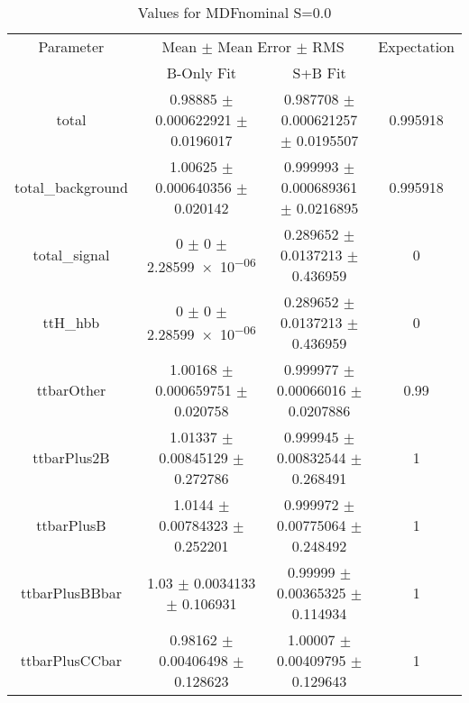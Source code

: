 \begin{table}
\centering
\caption{Values for MDFnominal S=0.0}
\begin{tabular}{cccc}
\toprule
Parameter & \multicolumn{2}{c}{Mean $\pm$ Mean Error $\pm$ RMS} & Expectation\\
 & B-Only Fit & S+B Fit & \\
\midrule
total & \num{0.98885} $\pm$ \num{0.000622921} $\pm$ \num{0.0196017} & \num{0.987708} $\pm$ \num{0.000621257} $\pm$ \num{0.0195507} & \num{0.995918}\\
total\_background & \num{1.00625} $\pm$ \num{0.000640356} $\pm$ \num{0.020142} & \num{0.999993} $\pm$ \num{0.000689361} $\pm$ \num{0.0216895} & \num{0.995918}\\
total\_signal & \num{0} $\pm$ \num{0} $\pm$ \num{2.28599e-06} & \num{0.289652} $\pm$ \num{0.0137213} $\pm$ \num{0.436959} & \num{0}\\
ttH\_hbb & \num{0} $\pm$ \num{0} $\pm$ \num{2.28599e-06} & \num{0.289652} $\pm$ \num{0.0137213} $\pm$ \num{0.436959} & \num{0}\\
ttbarOther & \num{1.00168} $\pm$ \num{0.000659751} $\pm$ \num{0.020758} & \num{0.999977} $\pm$ \num{0.00066016} $\pm$ \num{0.0207886} & \num{0.99}\\
ttbarPlus2B & \num{1.01337} $\pm$ \num{0.00845129} $\pm$ \num{0.272786} & \num{0.999945} $\pm$ \num{0.00832544} $\pm$ \num{0.268491} & \num{1}\\
ttbarPlusB & \num{1.0144} $\pm$ \num{0.00784323} $\pm$ \num{0.252201} & \num{0.999972} $\pm$ \num{0.00775064} $\pm$ \num{0.248492} & \num{1}\\
ttbarPlusBBbar & \num{1.03} $\pm$ \num{0.0034133} $\pm$ \num{0.106931} & \num{0.99999} $\pm$ \num{0.00365325} $\pm$ \num{0.114934} & \num{1}\\
ttbarPlusCCbar & \num{0.98162} $\pm$ \num{0.00406498} $\pm$ \num{0.128623} & \num{1.00007} $\pm$ \num{0.00409795} $\pm$ \num{0.129643} & \num{1}\\
\bottomrule
\end{tabular}
\end{table}